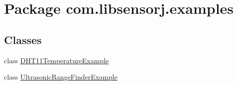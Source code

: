 \hypertarget{namespacecom_1_1libsensorj_1_1examples}{}\section{Package com.\+libsensorj.\+examples}
\label{namespacecom_1_1libsensorj_1_1examples}
\subsection*{Classes}
\begin{DoxyCompactItemize}
\item 
class \hyperlink{classcom_1_1libsensorj_1_1examples_1_1DHT11TemperatureExample}{D\+H\+T11\+Temperature\+Example}
\item 
class \hyperlink{classcom_1_1libsensorj_1_1examples_1_1UltrasonicRangeFinderExample}{Ultrasonic\+Range\+Finder\+Example}
\end{DoxyCompactItemize}
